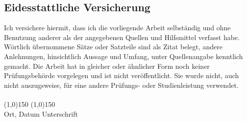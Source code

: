 \thispagestyle{empty}
\begin{center}
	\section*{Eidesstattliche Versicherung}
\end{center}
\vspace*{1cm}
\noindent
Ich versichere hiermit, dass ich die vorliegende Arbeit selbständig und ohne Benutzung anderer als der
angegebenen Quellen und Hilfsmittel verfasst habe. Wörtlich übernommene Sätze oder Satzteile sind als
Zitat belegt, andere Anlehnungen, hinsichtlich Aussage und Umfang, unter Quellenangabe kenntlich
gemacht. Die Arbeit hat in gleicher oder ähnlicher Form noch keiner Prüfungsbehörde vorgelegen und ist
nicht veröffentlicht. Sie wurde nicht, auch nicht auszugsweise, für eine andere Prüfungs- oder
Studienleistung verwendet.
\vspace*{1cm}
~\\
~\\
\line(1,0){150} \hfill \line(1,0){150}\\
Ort, Datum \hfill Unterschrift \hspace*{3cm}
\vspace*{1.5cm}
